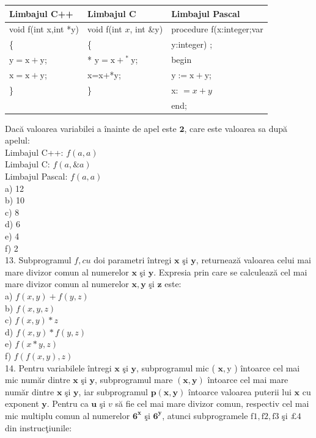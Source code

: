 \documentclass[10pt]{article}
\begin{document}
\begin{center}
\begin{tabular}{|l|l|l|}
\hline
Limbajul C++ & Limbajul C & Limbajul Pascal \\
\hline
void f(int x,int *y) & void f(int $x$, int \&y) & procedure f(x:integer;var \\
\hline
\{ & \{ & y:integer) ; \\
\hline
$\mathrm{y}=\mathrm{x}+\mathrm{y}$; & * $\mathrm{y}=\mathrm{x}+{ }^{\text {* }} \mathrm{y}$; & begin \\
\hline
$\mathrm{x}=\mathrm{x}+\mathrm{y}$; & x=x+*y; & $\mathrm{y}:=\mathrm{x}+\mathrm{y}$; \\
\hline
\} & \} & x: $=x+y$ \\
\hline
 &  & end; \\
\hline
\end{tabular}
\end{center}

Dacă valoarea variabilei a înainte de apel este $\mathbf{2}$, care este valoarea sa după apelul:\\
Limbajul C++: $f(a, a)$\\
Limbajul C: $f(a, \& a)$\\
Limbajul Pascal: $f(a, a)$\\
a) 12\\
b) 10\\
c) 8\\
d) 6\\
e) 4\\
f) 2\\
13. Subprogramul $f, c u$ doi parametri întregi $\mathbf{x}$ şi $\mathbf{y}$, returnează valoarea celui mai mare divizor comun al numerelor $\mathbf{x}$ şi $\mathbf{y}$. Expresia prin care se calculează cel mai mare divizor comun al numerelor $\mathbf{x}, \mathbf{y}$ şi $\mathbf{z}$ este:\\
a) $f(x, y)+f(y, z)$\\
b) $f(x, y, z)$\\
c) $f(x, y) * z$\\
d) $f(x, y) * f(y, z)$\\
e) $f(x * y, z)$\\
f) $f(f(x, y), z)$\\
14. Pentru variabilele întregi $\mathbf{x}$ şi $\mathbf{y}$, subprogramul mic ( $\mathbf{x}, \mathrm{y}$ ) întoarce cel mai mic număr dintre $\mathbf{x}$ şi $\mathbf{y}$, subprogramul mare $(\mathbf{x}, \mathbf{y})$ întoarce cel mai mare număr dintre $\mathbf{x}$ şi $\mathbf{y}$, iar subprogramul $\mathbf{p}(\mathbf{x}, \mathbf{y})$ întoarce valoarea puterii lui $\mathbf{x}$ cu exponent $\mathbf{y}$. Pentru ca $\mathbf{u}$ şi $v$ să fie cel mai mare divizor comun, respectiv cel mai mic multiplu comun al numerelor $\mathbf{6}^{\boldsymbol{x}}$ şi $\mathbf{6}^{\boldsymbol{y}}$, atunci subprogramele $\mathrm{f} 1, \mathrm{f} 2, \mathrm{f} 3$ şi $\pounds 4$ din instrucţiunile:
\end{document}
